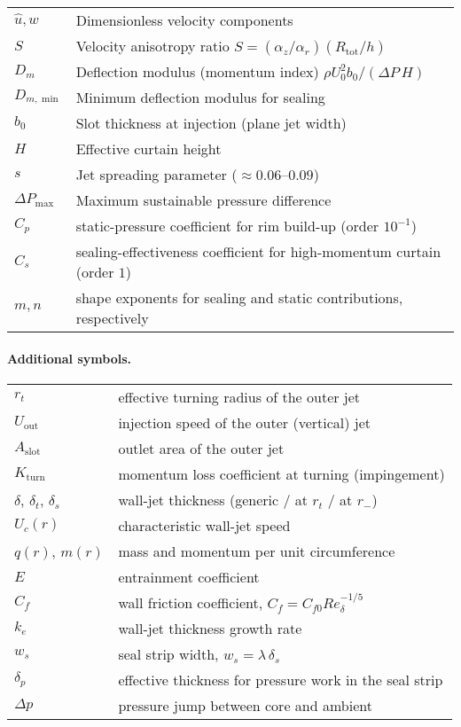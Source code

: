 \documentclass[11pt,a4paper]{article}
\begin{document}
\begin{tabular}{@{}ll@{}}
$\hat u,\hat w$ & Dimensionless velocity components \\
$S$ & Velocity anisotropy ratio $S=(\alpha_z/\alpha_r)(R_{\mathrm{tot}}/h)$ \\ $D_m$ & Deflection modulus (momentum index) $\rho U_0^2 b_0/(\Delta P\,H)$ \\
$D_{m,\min}$ & Minimum deflection modulus for sealing \\
$b_0$ & Slot thickness at injection (plane jet width) \\
$H$ & Effective curtain height \\
$s$ & Jet spreading parameter ($\approx0.06$--$0.09$) \\
$\Delta P_{\max}$ & Maximum sustainable pressure difference \\
\bottomrule
$C_p$ & static-pressure coefficient for rim build-up (order $10^{-1}$)\\
$C_s$ & sealing-effectiveness coefficient for high-momentum curtain (order $1$)\\
$m,n$ & shape exponents for sealing and static contributions, respectively\\
\end{tabular}


\paragraph{Additional symbols.}
\begin{tabular}{ll}
\(r_t\) & effective turning radius of the outer jet \\
\(U_{\mathrm{out}}\) & injection speed of the outer (vertical) jet \\
\(A_{\mathrm{slot}}\) & outlet area of the outer jet \\
\(K_{\mathrm{turn}}\) & momentum loss coefficient at turning (impingement) \\
\(\delta\), \(\delta_t\), \(\delta_s\) & wall-jet thickness (generic / at \(r_t\) / at \(r_-\)) \\
\(U_c(r)\) & characteristic wall-jet speed \\
\(q(r)\), \(m(r)\) & mass and momentum per unit circumference \\
\(E\) & entrainment coefficient \\
\(C_f\) & wall friction coefficient, \(C_f=C_{f0} Re_\delta^{-1/5}\) \\
\(k_e\) & wall-jet thickness growth rate \\
\(w_s\) & seal strip width, \(w_s=\lambda\,\delta_s\) \\
\(\delta_p\) & effective thickness for pressure work in the seal strip \\
\(\Delta p\) & pressure jump between core and ambient
\end{tabular}
\end{document}

